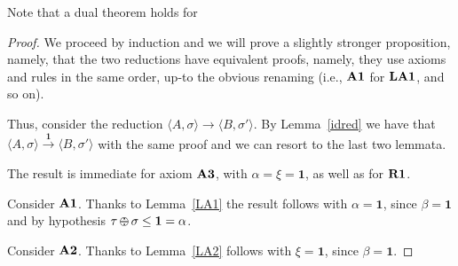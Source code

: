 \documentclass{llncs}
\def\1{{\mathbf 1}}
\newcommand{\comment}[1]{}
\newcommand{\tell}{{\bf tell}}
\newcommand{\ask}{{\bf ask}}
\def\monid{{\mathbf 0}}
\def\1{{\mathbf 1}}
\def\odiv{\, {\ominus\hspace{-7.7pt} \div} \,}
\def\monid{\mathbf{1}}
\begin{document}

Note that a dual theorem holds for 

\begin{proof}
We proceed by induction and we will prove a slightly stronger proposition, namely, that the two reductions
have equivalent proofs, namely, they use axioms and rules in the same order,
up-to the obvious renaming (i.e., ${\bf A1}$ for ${\bf LA1}$, and so on).

Thus, consider the reduction $\langle A, \sigma \rangle \to \langle B, \sigma' \rangle$. 
By Lemma~\ref{idred} we have that 
$\langle A, \sigma \rangle \xrightarrow{\monid} \langle B, \sigma' \rangle$
with the same proof and we can resort to the last two lemmata.

The result is immediate for axiom ${\bf A3}$, with 
$\alpha = \xi = \monid$, as well as for 
${\bf R1}$.

Consider ${\bf A1}$. 
Thanks to Lemma~\ref{LA1}
the result follows with $\alpha = \1$,
since 
$\beta = \monid$ and by hypothesis $\tau \odiv \sigma \leq \1 = \alpha$.

Consider ${\bf A2}$.
Thanks to Lemma~\ref{LA2} follows with $\xi = \1$,
since $\beta = \monid$.

\comment{
 we have 
$\langle \hbox{\ask}(c) \mapsto A, \tau \rangle \xrightarrow{} \langle A, \tau \rangle$ 
with $\tau \leq c$ and thus
$\langle \hbox{\ask}(c) \mapsto A, \tau \rangle \xrightarrow{\alpha} \langle A, \alpha \otimes \tau \rangle$ 
for some $\alpha \leq c\odiv \tau$.
%
Now $\sigma \leq c$
implies $\sigma \odiv \tau \leq c \odiv \tau$,
so it suffices to consider any $\alpha$ such that
$\sigma \odiv \tau \leq \alpha \leq c \odiv \tau$.
Indeed, as noted above this implies that $\sigma \leq \alpha \otimes \tau$
and by invertibility 
$\sigma' = \sigma = \alpha \otimes \tau \otimes  (\sigma \odiv (\tau \otimes \alpha)) = \tau' \otimes  (\sigma \odiv (\tau \otimes \alpha))$.
\marginpar{se localizzato, allora vale anche $\alpha \leq \1$}
}


\end{proof}
\end{document}
